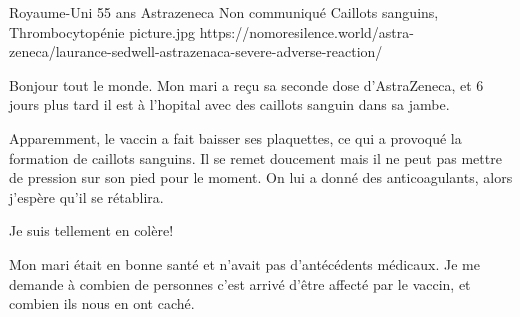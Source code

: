           {Royaume-Uni}
          {55 ans}
          {Astrazeneca}
          {Non communiqué}
          {Caillots sanguins, Thrombocytopénie}
          {picture.jpg}
          {https://nomoresilence.world/astra-zeneca/laurance-sedwell-astrazenaca-severe-adverse-reaction/}
          {

Bonjour tout le monde. Mon mari a reçu sa seconde dose d'AstraZeneca, et 6 jours
plus tard il est à l'hopital avec des caillots sanguin dans sa jambe.

Apparemment, le vaccin a fait baisser ses plaquettes, ce qui a provoqué la
formation de caillots sanguins. Il se remet doucement mais il ne peut pas mettre
de pression sur son pied pour le moment. On lui a donné des anticoagulants,
alors j'espère qu'il se rétablira.

Je suis tellement en colère!

Mon mari était en bonne santé et n'avait pas d'antécédents médicaux. Je me
demande à combien de personnes c'est arrivé d'être affecté par le vaccin, et
combien ils nous en ont caché.

}
